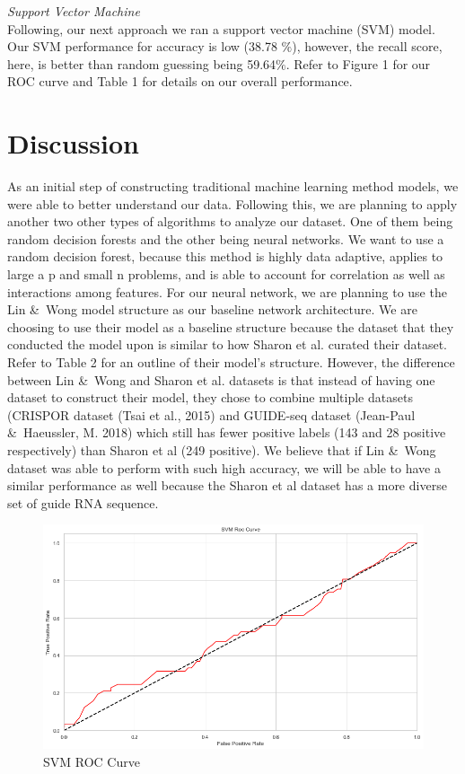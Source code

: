 \documentclass[10pt,twocolumn,letterpaper]{article}
\begin{document}
\textit{Support Vector Machine\\}
Following, our next approach we ran a support vector machine (SVM) model. Our SVM performance for accuracy is low (38.78 $\%$), however, the recall score, here, is better than random guessing being 59.64$\%$. Refer to Figure 1 for our ROC curve  and Table 1 for details on our overall performance. 

\section*{Discussion}
As an initial step of constructing traditional machine learning method models, we were able to better understand our data. Following this, we are planning to apply another two other types of algorithms to analyze our dataset. One of them being random decision forests and the other being neural networks. We want to use a random decision forest, because this method is highly data adaptive, applies to large a p and small n problems, and is able to account for correlation as well as interactions among features. For our neural network, we are planning to use the Lin \&\ Wong model structure as our baseline network architecture. We are choosing to use their model as a baseline structure because the dataset that they conducted the model upon is similar to how Sharon et al. curated their dataset. Refer to Table 2 for an outline of their model’s structure.  However, the difference between Lin \&\ Wong and Sharon et al. datasets is that instead of having one dataset to construct their model, they chose to combine multiple datasets (CRISPOR dataset (Tsai et al., 2015) and GUIDE-seq dataset (Jean-Paul \&\ Haeussler, M. 2018) which still has fewer positive labels (143 and 28 positive respectively) than Sharon et al (249 positive). We believe that if  Lin \&\ Wong dataset was able to perform with such high accuracy, we will be able to have a similar performance as well because the Sharon et al dataset has a more diverse set of guide RNA sequence. 

\begin{figure}
	\includegraphics[width=\linewidth,height=\textheight,keepaspectratio]{SVM_I}
	\caption{SVM ROC Curve }
\end{figure}
	
\end{document}
